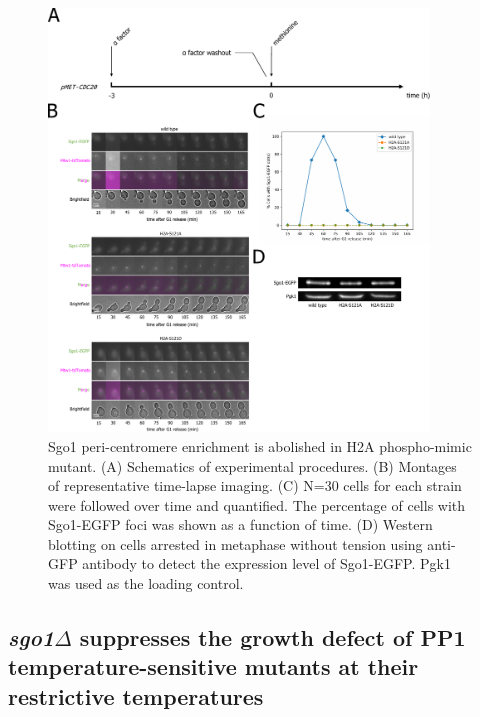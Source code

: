 \begin{figure}[htbp]
  \centering
  \includegraphics[width=0.9\textwidth]{chapter3/figures/Sgo1 in H2A mutants imaging.pdf}
  \caption[Sgo1 peri-centromere enrichment is abolished in H2A phospho-mimic mutant]{Sgo1 peri-centromere enrichment is abolished in H2A phospho-mimic mutant. (A) Schematics of experimental procedures. (B) Montages of representative time-lapse imaging. (C) N=30 cells for each strain were followed over time and quantified. The percentage of cells with Sgo1-EGFP foci was shown as a function of time. (D) Western blotting on cells arrested in metaphase without tension using anti-GFP antibody to detect the expression level of Sgo1-EGFP. Pgk1 was used as the loading control.}
  \label{fig:sgo1imagingh2amutants}
\end{figure}

\subsection{\textit{sgo1$\Delta$} suppresses the growth defect of PP1 temperature-sensitive mutants at their restrictive temperatures}

